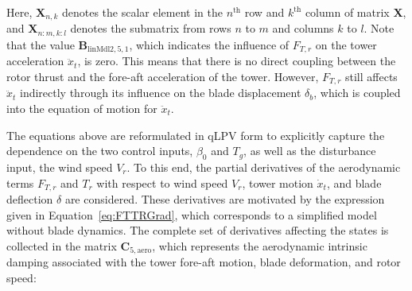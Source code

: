 Here, \(\bm{X}_{n,k}\) denotes the scalar element in the \(n^\text{th}\) row and \(k^\text{th}\) column of matrix \(\bm{X}\), and \(\bm{X}_{n:m, k:l}\) denotes the submatrix from rows \(n\) to \(m\) and columns \(k\) to \(l\). Note that the value $\bm{B}_{\text{linMdl2}, 5, 1}$, which indicates the influence of $F_{T,r}$ on the tower acceleration $\ddot{x}_t$, is zero. This means that there is no direct coupling between the rotor thrust and the fore-aft acceleration of the tower. However, $F_{T,r}$ still affects $\ddot{x}_t$ indirectly through its influence on the blade displacement $\delta_b$, which is coupled into the equation of motion for $\ddot{x}_t$.

The equations above are reformulated in qLPV form to explicitly capture the dependence on the two control inputs, \(\beta_0\) and \(T_g\), as well as the disturbance input, the wind speed \(V_r\). To this end, the partial derivatives of the aerodynamic terms \(F_{T,r}\) and \(T_r\) with respect to wind speed \(V_r\), tower motion \(\dot{x}_t\), and blade deflection \(\delta\) are considered. These derivatives are motivated by the expression given in Equation~\eqref{eq:FTTRGrad}, which corresponds to a simplified model without blade dynamics. The complete set of derivatives affecting the states is collected in the matrix \(\mathbf{C}_{5,\text{aero}}\), which represents the aerodynamic intrinsic damping associated with the tower fore-aft motion, blade deformation, and rotor speed:
